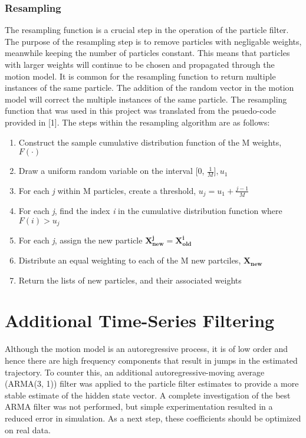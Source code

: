 \documentclass[12pt, a4paper]{article}
\begin{document}
		\subsubsection{Resampling}
			The resampling function is a crucial step in the operation of the particle filter. The purpose of the resampling step is to remove particles with negligable weights, meanwhile keeping the number of particles constant. This means that particles with larger weights will continue to be chosen and propagated through the motion model. It is common for the resampling function to return multiple instances of the same particle. The addition of the random vector in the motion model will correct the multiple instances of the same particle. The resampling function that was used in this project was translated from the psuedo-code provided in [1].
			The steps within the resampling algorithm are as follows: 

			\begin{enumerate}
				\item Construct the sample cumulative distribution function of the M weights, $ F(\cdotp) $
				\item Draw a uniform random variable on the interval [0, $\frac{1}{M}], u_{1} $
				\item For each \textit{j} within M particles, create a threshold, $u_{j} = u_{1} + \frac{j-1}{M}$
				\item For each \textit{j}, find the index \textit{i} in the cumulative distribution function where $ F(\mathit{i}) > u_{j}$
				\item For each \textit{j}, assign the new particle $\mathbf{X_{new}^{j} = X_{old}^{i}}$
				\item Distribute an equal weighting to each of the M new partciles, $\mathbf{X_{new}}$
				\item Return the lists of new particles, and their associated weights
			\end{enumerate}


	\section{Additional Time-Series Filtering}
			Although the motion model is an autoregressive process, it is of low order and hence there are high frequency components that result in jumps in the estimated trajectory. To counter this, an additional autoregressive-moving average (ARMA(3, 1)) filter was applied to the particle filter estimates to provide a more stable estimate of the hidden state vector. A complete investigation of the best ARMA filter was not performed, but simple experimentation resulted in a reduced error in simulation. As a next step, these coefficients should be optimized on real data.
\end{document}
